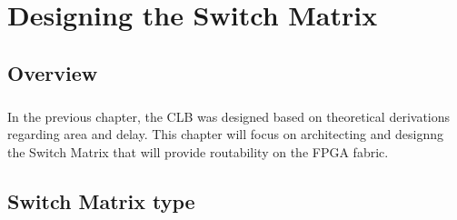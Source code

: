 %
%
\let\textcircled=\pgftextcircled
\chapter{Designing the Switch Matrix}
\label{chap:SWITCH_MATRIX_design}
\paragraph{}

\section{Overview}

\paragraph{}
In the previous chapter, the CLB was designed based on theoretical derivations regarding area and delay. This chapter will focus on architecting and designng the Switch Matrix that will provide routability on the FPGA fabric.

\section{Switch Matrix type}
\paragraph{}

